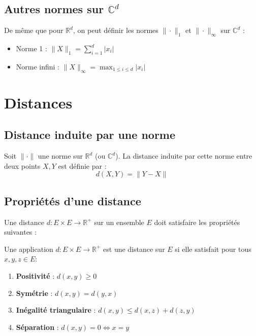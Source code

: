 \documentclass[oneside]{book}
\begin{document}
\subsection{Autres normes sur $\mathbb{C}^d$}

De même que pour $\mathbb{R}^d$, on peut définir les normes $\|\cdot\|_1$ et $\|\cdot\|_\infty$ sur $\mathbb{C}^d$ :
\begin{itemize}
    \item Norme 1 : $\|X\|_1 = \sum_{i=1}^d |x_i|$
    \item Norme infini : $\|X\|_\infty = \max_{1 \leq i \leq d} |x_i|$
\end{itemize}


\section{Distances}

\subsection{Distance induite par une norme}

\begin{definition}
Soit $\|\cdot\|$ une norme sur $\mathbb{R}^d$ (ou $\mathbb{C}^d$). La distance induite par cette norme entre deux points $X, Y$ est définie par :
\[
d(X, Y) = \|Y - X\|
\]
\end{definition}

\subsection{Propriétés d'une distance}

Une distance $d : E \times E \to \mathbb{R}^+$ sur un ensemble $E$ doit satisfaire les propriétés suivantes :

\begin{definition}
Une application $d: E \times E \to \mathbb{R}^+$ est une distance sur $E$ si elle satisfait pour tous $x, y, z \in E$:
\begin{enumerate}
    \item \textbf{Positivité} : $d(x, y) \geq 0$
    \item \textbf{Symétrie} : $d(x, y) = d(y, x)$
    \item \textbf{Inégalité triangulaire} : $d(x, y) \leq d(x, z) + d(z, y)$
    \item \textbf{Séparation} : $d(x, y) = 0 \iff x = y$
\end{enumerate}
\end{definition}
\end{document}
